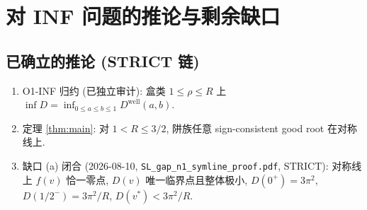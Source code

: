 \documentclass[UTF8]{ctexart}
\begin{document}
\section{对 INF 问题的推论与剩余缺口}\label{sec:gaps}

\subsection{已确立的推论 (STRICT 链)}
\begin{enumerate}
	\item O1-INF 归约 (已独立审计): 盒类 $1\le\rho\le R$ 上
		$\inf D=\inf_{0\le a\le b\le1}D^{\text{well}}(a,b)$.
	\item 定理 \ref{thm:main}: 对 $1<R\le3/2$, 阱族任意 sign-consistent good root
		在对称线上.
	\item 缺口 (a) 闭合 (2026-08-10, \texttt{SL\_gap\_n1\_symline\_proof.pdf}, STRICT): 对称线上
		$f(v)$ 恰一零点, $D(v)$ 唯一临界点且整体极小, $D(0^+)=3\pi^2$,
		$D(1/2^-)=3\pi^2/R$, $D(v^*)<3\pi^2/R$.
\end{enumerate}
\end{document}
